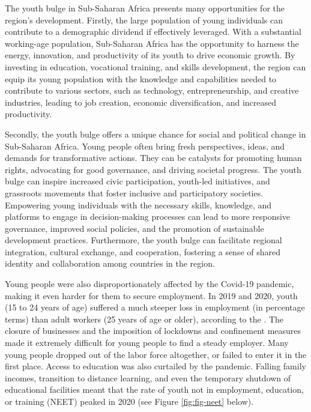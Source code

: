 \documentclass[
  a4paper, twoside, 12pt]{book}
\begin{document}
The youth bulge in Sub-Saharan Africa presents many opportunities for the region's development. Firstly, the large population of young individuals can contribute to a demographic dividend if effectively leveraged. With a substantial working-age population, Sub-Saharan Africa has the opportunity to harness the energy, innovation, and productivity of its youth to drive economic growth. By investing in education, vocational training, and skills development, the region can equip its young population with the knowledge and capabilities needed to contribute to various sectors, such as technology, entrepreneurship, and creative industries, leading to job creation, economic diversification, and increased productivity.

Secondly, the youth bulge offers a unique chance for social and political change in Sub-Saharan Africa. Young people often bring fresh perspectives, ideas, and demands for transformative actions. They can be catalysts for promoting human rights, advocating for good governance, and driving societal progress. The youth bulge can inspire increased civic participation, youth-led initiatives, and grassroots movements that foster inclusive and participatory societies. Empowering young individuals with the necessary skills, knowledge, and platforms to engage in decision-making processes can lead to more responsive governance, improved social policies, and the promotion of sustainable development practices. Furthermore, the youth bulge can facilitate regional integration, cultural exchange, and cooperation, fostering a sense of shared identity and collaboration among countries in the region.

Young people were also disproportionately affected by the Covid-19 pandemic, making it even harder for them to secure employment. In 2019 and 2020, youth (15 to 24 years of age) suffered a much steeper loss in employment (in percentage terms) than adult workers (25 years of age or older), according to the \textcite{ilo2022a}. The closure of businesses and the imposition of lockdowns and confinement measures made it extremely difficult for young people to find a steady employer. Many young people dropped out of the labor force altogether, or failed to enter it in the first place. Access to education was also curtailed by the pandemic. Falling family incomes, transition to distance learning, and even the temporary shutdown of educational facilities meant that the rate of youth not in employment, education, or training (NEET) peaked in 2020 (see Figure \ref{fig:fig-neet} below).
\end{document}
